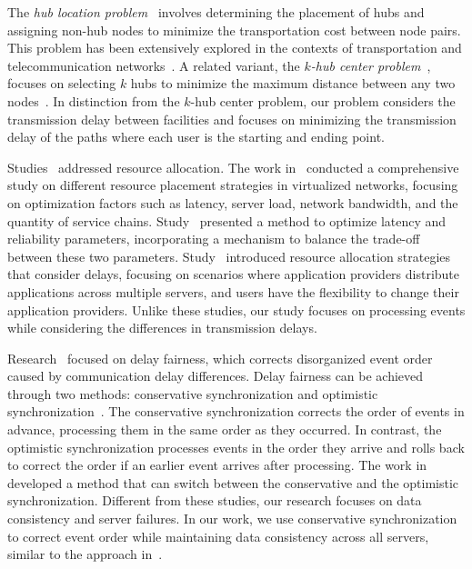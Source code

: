 \documentclass[10pt, letterpaper]{IEEEtran}
\begin{document}
\begin{CJK}{UTF8}{ipxm}
The {\it hub location problem}~\cite{Hub_Okelly1987} involves determining the placement of hubs and assigning non-hub nodes to minimize the transportation cost between node pairs. 
This problem has been extensively explored in the contexts of transportation and telecommunication networks~\cite{3_1_Alumar2008,3_6_Farahani2013}. 
A related variant, the {\it $k$-hub center problem}~\cite{HubCenter_Campbell2007}, focuses on selecting $k$ hubs to minimize the maximum distance between any two nodes~\cite{3_4_Campbell1994,3_12_Okelly1991}. 
In distinction from the $k$-hub center problem, our problem considers the transmission delay between facilities and focuses on minimizing the transmission delay of the paths where each user is the starting and ending point.

Studies~\cite{KawabataTSNM2025_19,KawabataTSNM2025_20,KawabataTSNM2025_21} addressed resource allocation.
The work in~\cite{KawabataTSNM2025_19} conducted a comprehensive study on different resource placement strategies in virtualized networks, focusing on optimization factors such as latency, server load, network bandwidth, and the quantity of service chains.
Study~\cite{KawabataTSNM2025_20} presented a method to optimize latency and reliability parameters, incorporating a mechanism to balance the trade-off between these two parameters.
Study~\cite{KawabataTSNM2025_21} introduced resource allocation strategies that consider delays, focusing on scenarios where application providers distribute applications across multiple servers, and users have the flexibility to change their application providers.
Unlike these studies, our study focuses on processing events while considering the differences in transmission delays.

Research~\cite{KawabataTSNM2025_5,KawabataTNSM2025} focused on delay fairness, which corrects disorganized event order caused by communication delay differences.
Delay fairness can be achieved through two methods: conservative synchronization and optimistic synchronization~\cite{KawabataTSNM2025_5}.
The conservative synchronization corrects the order of events in advance, processing them in the same order as they occurred.
In contrast, the optimistic synchronization processes events in the order they arrive and rolls back to correct the order if an earlier event arrives after processing.
The work in~\cite{KawabataTNSM2025} developed a method that can switch between the conservative and the optimistic synchronization.
Different from these studies, our research focuses on data consistency and server failures.
In our work, we use conservative synchronization to correct event order while maintaining data consistency across all servers, similar to the approach in~\cite{CMND}.


\end{CJK}
\end{document}

